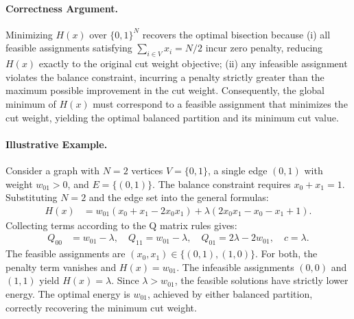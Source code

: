 \documentclass[12pt]{article}
\begin{document}
\paragraph{Correctness Argument.}
Minimizing $H(x)$ over $\{0,1\}^N$ recovers the optimal bisection because (i) all feasible assignments satisfying $\sum_{i \in V} x_i = N/2$ incur zero penalty, reducing $H(x)$ exactly to the original cut weight objective; (ii) any infeasible assignment violates the balance constraint, incurring a penalty strictly greater than the maximum possible improvement in the cut weight. Consequently, the global minimum of $H(x)$ must correspond to a feasible assignment that minimizes the cut weight, yielding the optimal balanced partition and its minimum cut value.

\paragraph{Illustrative Example.}
Consider a graph with $N=2$ vertices $V=\{0,1\}$, a single edge $(0,1)$ with weight $w_{01} > 0$, and $E=\{(0,1)\}$. The balance constraint requires $x_0 + x_1 = 1$. Substituting $N=2$ and the edge set into the general formulas:
\begin{align}
H(x) &= w_{01}(x_0 + x_1 - 2x_0 x_1) + \lambda \left( 2x_0 x_1 - x_0 - x_1 + 1 \right).
\end{align}
Collecting terms according to the Q matrix rules gives:
\begin{align}
Q_{00} &= w_{01} - \lambda, \quad Q_{11} = w_{01} - \lambda, \quad Q_{01} = 2\lambda - 2w_{01}, \quad c = \lambda.
\end{align}
The feasible assignments are $(x_0,x_1) \in \{(0,1), (1,0)\}$. For both, the penalty term vanishes and $H(x) = w_{01}$. The infeasible assignments $(0,0)$ and $(1,1)$ yield $H(x) = \lambda$. Since $\lambda > w_{01}$, the feasible solutions have strictly lower energy. The optimal energy is $w_{01}$, achieved by either balanced partition, correctly recovering the minimum cut weight.
\end{document}
